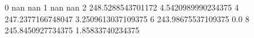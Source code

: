 0 nan nan
1 nan nan
2 248.5288543701172 4.5420989990234375
4 247.2377166748047 3.2509613037109375
6 243.98675537109375 0.0
8 245.8450927734375 1.85833740234375
